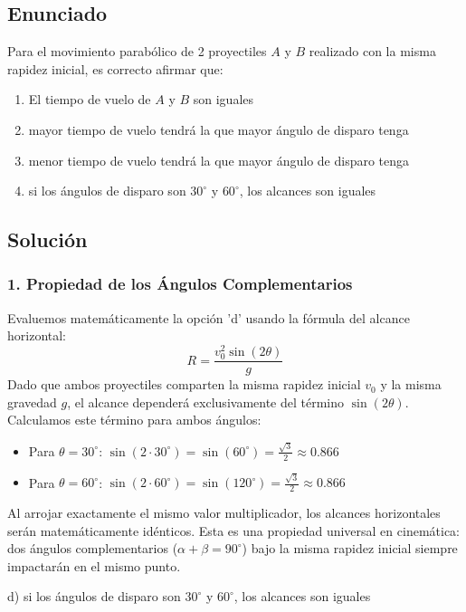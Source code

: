 \documentclass[12pt, a4paper]{article}
\begin{document}
\newpage

\subsection*{Enunciado}
Para el movimiento parabólico de 2 proyectiles $A$ y $B$ realizado con la misma rapidez inicial, es correcto afirmar que:
\begin{enumerate}[label=\alph*)]
    \item El tiempo de vuelo de $A$ y $B$ son iguales
    \item mayor tiempo de vuelo tendrá la que mayor ángulo de disparo tenga
    \item menor tiempo de vuelo tendrá la que mayor ángulo de disparo tenga
    \item si los ángulos de disparo son $30^\circ$ y $60^\circ$, los alcances son iguales
\end{enumerate}

\subsection*{Solución}

\subsubsection*{1. Propiedad de los Ángulos Complementarios}
Evaluemos matemáticamente la opción 'd' usando la fórmula del alcance horizontal:
$$ R = \frac{v_0^2 \sin(2\theta)}{g} $$
Dado que ambos proyectiles comparten la misma rapidez inicial $v_0$ y la misma gravedad $g$, el alcance dependerá exclusivamente del término $\sin(2\theta)$.
Calculamos este término para ambos ángulos:
\begin{itemize}
    \item Para $\theta = 30^\circ$: $\sin(2 \cdot 30^\circ) = \sin(60^\circ) = \frac{\sqrt{3}}{2} \approx 0.866$
    \item Para $\theta = 60^\circ$: $\sin(2 \cdot 60^\circ) = \sin(120^\circ) = \frac{\sqrt{3}}{2} \approx 0.866$
\end{itemize}
Al arrojar exactamente el mismo valor multiplicador, los alcances horizontales serán matemáticamente idénticos. Esta es una propiedad universal en cinemática: dos ángulos complementarios ($\alpha + \beta = 90^\circ$) bajo la misma rapidez inicial siempre impactarán en el mismo punto.

\begin{tcolorbox}[colback=green!5!white, colframe=green!50!black, title=Respuesta Final]
\centering \Large d) si los ángulos de disparo son $30^\circ$ y $60^\circ$, los alcances son iguales
\end{tcolorbox}
\end{document}
